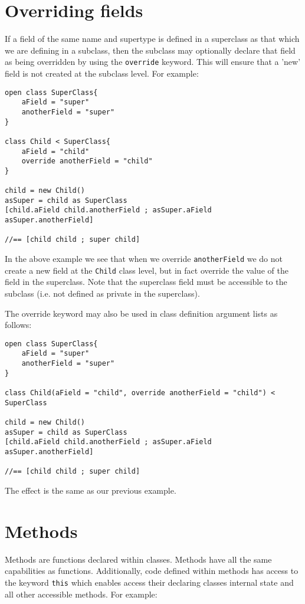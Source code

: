 \documentclass[conc-doc]{subfiles}
\begin{document}
\section{Overriding fields}
If a field of the same name and supertype is defined in a superclass as that which we are defining in a subclass, then the subclass may optionally declare that field as being overridden by using the \lstinline{override} keyword. This will ensure that a 'new' field is not created at the subclass level. For example:
\begin{lstlisting}
open class SuperClass{
	aField = "super"
	anotherField = "super"
}

class Child < SuperClass{
	aField = "child"
	override anotherField = "child"
}

child = new Child()
asSuper = child as SuperClass
[child.aField child.anotherField ; asSuper.aField asSuper.anotherField]

//== [child child ; super child]
\end{lstlisting}

In the above example we see that when we override \lstinline{anotherField} we do not create a new field at the \lstinline{Child} class level, but in fact override the value of the field in the superclass. Note that the superclass field must be accessible to the subclass (i.e. not defined as private in the superclass).

The override keyword may also be used in class definition argument lists as follows:
\begin{lstlisting}
open class SuperClass{
	aField = "super"
	anotherField = "super"
}

class Child(aField = "child", override anotherField = "child") < SuperClass

child = new Child()
asSuper = child as SuperClass
[child.aField child.anotherField ; asSuper.aField asSuper.anotherField]

//== [child child ; super child]
\end{lstlisting}

The effect is the same as our previous example.

\section{Methods}
Methods are functions declared within classes. Methods have all the same capabilities as functions. Additionally, code defined within methods has access to the keyword \lstinline{this} which enables access their declaring classes internal state and all other accessible methods. For example:
\end{document}
